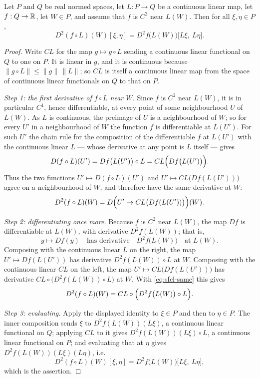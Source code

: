 \begin{lemma}
Let $P$ and $Q$ be real normed spaces, let $L:P\to Q$ be a continuous linear
map, let $f:Q\to\mathbb{R}$, let $W\in P$, and assume that $f$ is $C^2$ near $L(W)$.
Then for all $\xi,\eta\in P$,
\[
  D^2(f\circ L)(W)[\xi,\eta]=D^2f\bigl(L(W)\bigr)\bigl[L\xi,\ L\eta\bigr].
\]
\end{lemma}
\begin{proof}
Write $CL$ for the map $g\mapsto g\circ L$ sending a continuous linear
functional on $Q$ to one on $P$. It is linear in $g$, and it is continuous
because $\|g\circ L\|\le\|g\|\,\|L\|$; so $CL$ is itself a continuous linear map
from the space of continuous linear functionals on $Q$ to that on $P$.

\emph{Step 1: the first derivative of $f\circ L$ near $W$.}
Since $f$ is $C^2$ near $L(W)$, it is in particular $C^1$, hence differentiable,
at every point of some neighbourhood $U$ of $L(W)$. As $L$ is continuous, the
preimage of $U$ is a neighbourhood of $W$; so for every $U'$ in a neighbourhood
of $W$ the function $f$ is differentiable at $L(U')$. For such $U'$ the chain
rule for the composition of the differentiable $f$ at $L(U')$ with the
continuous linear $L$ --- whose derivative at any point is $L$ itself --- gives
\[
  D(f\circ L)(U')=Df\bigl(L(U')\bigr)\circ L=CL\Bigl(Df\bigl(L(U')\bigr)\Bigr).
\]
Thus the two functions $U'\mapsto D(f\circ L)(U')$ and
$U'\mapsto CL\bigl(Df(L(U'))\bigr)$ agree on a neighbourhood of $W$, and
therefore have the same derivative at $W$:
\begin{equation}\label{eq:sfcl-same}
  D^2(f\circ L)(W)=D\Bigl(U'\mapsto CL\bigl(Df(L(U'))\bigr)\Bigr)(W).
\end{equation}

\emph{Step 2: differentiating once more.}
Because $f$ is $C^2$ near $L(W)$, the map $Df$ is differentiable at $L(W)$, with
derivative $D^2f(L(W))$; that is,
\[
  y\longmapsto Df(y)\quad\text{has derivative}\quad D^2f\bigl(L(W)\bigr)
  \quad\text{at }L(W).
\]
Composing with the continuous linear $L$ on the right, the map
$U'\mapsto Df(L(U'))$ has derivative $D^2f(L(W))\circ L$ at $W$. Composing with
the continuous linear $CL$ on the left, the map
$U'\mapsto CL\bigl(Df(L(U'))\bigr)$ has derivative
$CL\circ\bigl(D^2f(L(W))\circ L\bigr)$ at $W$. With \eqref{eq:sfcl-same} this
gives
\[
  D^2(f\circ L)(W)=CL\circ\Bigl(D^2f\bigl(L(W)\bigr)\circ L\Bigr).
\]

\emph{Step 3: evaluating.}
Apply the displayed identity to $\xi\in P$ and then to $\eta\in P$. The inner
composition sends $\xi$ to $D^2f(L(W))(L\xi)$, a continuous linear functional on
$Q$; applying $CL$ to it gives $D^2f(L(W))(L\xi)\circ L$, a continuous linear
functional on $P$; and evaluating that at $\eta$ gives
$D^2f(L(W))(L\xi)(L\eta)$, i.e.
\[
  D^2(f\circ L)(W)[\xi,\eta]=D^2f\bigl(L(W)\bigr)\bigl[L\xi,\ L\eta\bigr],
\]
which is the assertion.
\end{proof}
